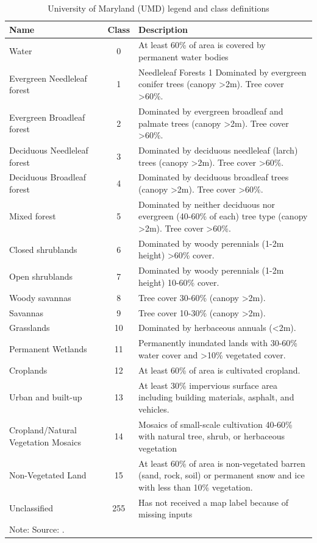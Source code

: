 \begin{table}[H]
\footnotesize
\caption{University of Maryland (UMD) legend and class definitions}
\begin{tabularx}{\textwidth}{l c X}
\hline
\hline
Name & Class & \centering\arraybackslash Description\\
\hline
Water	&	0	&	At least 60\% of area is covered by permanent water bodies	\\
Evergreen Needleleaf forest	&	1	&	Needleleaf Forests 1 Dominated by evergreen conifer trees (canopy >2m). Tree cover >60\%.	\\
Evergreen Broadleaf forest	&	2	&	Dominated by evergreen broadleaf and palmate trees (canopy >2m). Tree cover >60\%.	\\
Deciduous Needleleaf forest	&	3	&	Dominated by deciduous needleleaf (larch) trees (canopy >2m). Tree cover >60\%.	\\
Deciduous Broadleaf forest	&	4	&	Dominated by deciduous broadleaf trees (canopy >2m). Tree cover >60\%.	\\
Mixed forest	&	5	&	Dominated by neither deciduous nor evergreen (40-60\% of each) tree type (canopy >2m). Tree cover >60\%.	\\
Closed shrublands	&	6	&	Dominated by woody perennials (1-2m height) >60\% cover.	\\
Open shrublands	&	7	&	 Dominated by woody perennials (1-2m height) 10-60\% cover.	\\
Woody savannas	&	8	&	Tree cover 30-60\% (canopy >2m).	\\
Savannas	&	9	&	Tree cover 10-30\% (canopy >2m).	\\
Grasslands	&	10	&	 Dominated by herbaceous annuals (<2m).	\\
Permanent Wetlands	&	11	&	Permanently inundated lands with 30-60\% water cover and >10\% vegetated cover.	\\
Croplands	&	12	&	At least 60\% of area is cultivated cropland.	\\
Urban and built-up	&	13	&	At least 30\% impervious surface area including building materials, asphalt, and vehicles.	\\
Cropland/Natural Vegetation Mosaics	&	14	&	Mosaics of small-scale cultivation 40-60\% with natural tree, shrub, or herbaceous vegetation	\\
Non-Vegetated Land	&	15	&	At least 60\% of area is non-vegetated barren (sand, rock, soil) or permanent snow and ice with less than 10\% vegetation.	\\
Unclassified	&	255	&	 Has not received a map label because of missing inputs	\\
\hline
\hline
\multicolumn{3}{l}{\footnotesize  Note: Source: \cite{sulla2_2018}.}
\end{tabularx}
\label{UMD}
\end{table}


